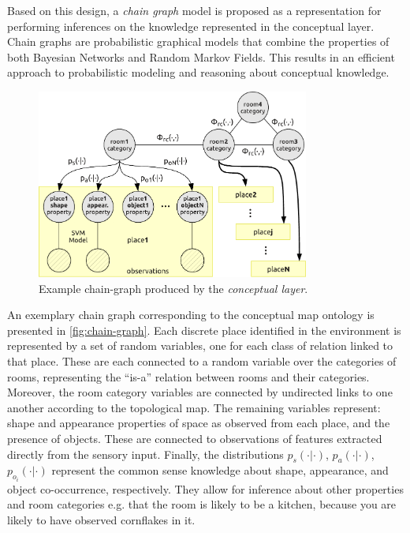 \documentclass[runningheads,a4paper]{llncs}
\begin{document}
Based on this design, a \emph{chain graph} model is proposed as a 
representation for performing inferences on the knowledge represented in the conceptual 
layer. Chain graphs are probabilistic graphical models that combine the properties of 
both Bayesian Networks and Random Markov Fields. This results in an efficient approach to 
probabilistic modeling and reasoning about conceptual knowledge.

\begin{figure}[h]
\centering
\includegraphics[width=0.80\textwidth]{figures/chaingraph.pdf}
\caption{\label{fig:chain-graph}Example chain-graph produced by the \emph{conceptual layer}.}
\end{figure}

An exemplary chain graph corresponding to the conceptual map ontology is presented
in \autoref{fig:chain-graph}. 
Each discrete place identified in the environment is represented by a set of random variables, 
one for each class of relation linked to that place. These are each connected to a random variable
over the categories of rooms, representing the ``is-a'' relation between rooms and their categories. 
Moreover, the room category variables are connected by undirected links to one another according 
to the topological map. The remaining variables represent: shape and appearance properties of space 
as observed from each place, and the presence of objects. 
These are connected to observations of features extracted directly from 
the sensory input. Finally, the 
distributions $p_{s}(\cdot|\cdot)$, $p_a(\cdot|\cdot)$, $p_{o_i}(\cdot|\cdot)$ 
represent the common sense knowledge about shape, appearance, and object co-occurrence, respectively. 
They allow for inference about other properties and room categories e.g. that the room is likely to be a kitchen,
because you are likely to have observed cornflakes in it. 
\end{document}
